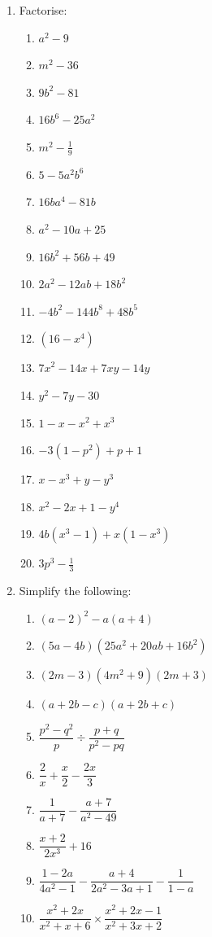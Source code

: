 \begin{eocexercises}{}
\begin{enumerate}[itemsep=5pt, label=\textbf{\arabic*}. ]
\item Factorise:
\begin{multicols}{2}
\begin{enumerate}[itemsep=5pt, label=\textbf{\alph*}. ] 
\item ${a}^{2}-9$
\item ${m}^{2}-36$
\item $9{b}^{2}-81$
\item $16{b}^{6}-25{a}^{2}$
\item ${m}^{2}-\frac{1}{9}$
\item $5-5{a}^{2}{b}^{6}$
\item $16b{a}^{4}-81b$
\item ${a}^{2}-10a+25$
\item $16{b}^{2}+56b+49$
\item $2{a}^{2}-12ab+18{b}^{2}$
\item $-4{b}^{2}-144{b}^{8}+48{b}^{5}$
\item $(16-{x}^{4})$
\item ${7x}^{2}-14x+7xy-14y$
\item ${y}^{2}-7y-30$
\item $1-x-{x}^{2}+{x}^{3}$
\item $-3(1-{p}^{2})+p+1$
\item $x-x^{3} + y - y^{3}$
\item $x^{2} - 2x + 1 - y^{4}$
\item $4b(x^{3} - 1) + x(1-x^{3})$
\item $3p^{3} - \frac{1}{3}$
\end{enumerate}
\end{multicols}


\item Simplify the following:
\begin{multicols}{2}
\begin{enumerate}[itemsep=5pt, label=\textbf{\alph*}. ] 

\item ${(a-2)}^{2}-a(a+4)$
\item $(5a-4b)(25{a}^{2}+20ab+16{b}^{2})$
\item $(2m-3)(4{m}^{2}+9)(2m+3)$
\item $(a+2b-c)(a+2b+c)$
\item $\dfrac{{p}^{2}-{q}^{2}}{p}÷\dfrac{p+q}{{p}^{2}-pq}$
\item $\dfrac{2}{x}+\dfrac{x}{2}-\dfrac{2x}{3}$
\item $\dfrac{1}{a+7}-\dfrac{a+7}{a^{2}-49}$
\item $\dfrac{x+2}{2x^{3}} + 16$
\item $\dfrac{1-2a}{4a^{2} -1} - \dfrac{a+4}{2a^{2}-3a+1} - \dfrac{1}{1-a}$
\item $\dfrac{x^{2} + 2x}{x^{2}+ x + 6} \times \dfrac{x^{2} + 2x - 1}{x^{2} + 3x +2}$
\end{enumerate}
\end{multicols}



\end{enumerate}
\end{eocexercises}
